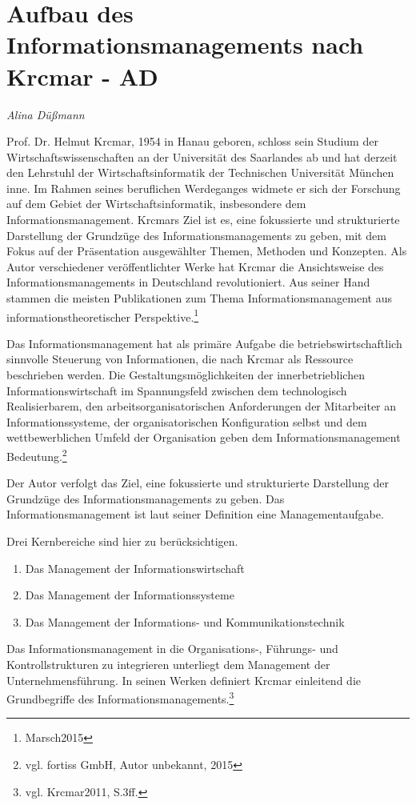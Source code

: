 \section{Aufbau des Informationsmanagements nach Krcmar - AD}
\textit{Alina Düßmann}


Prof. Dr. Helmut Krcmar, 1954 in Hanau geboren, schloss sein Studium der Wirtschaftswissenschaften an der Universität des Saarlandes ab und hat derzeit  den Lehrstuhl der Wirtschaftsinformatik der Technischen Universität München inne. Im Rahmen seines beruflichen Werdeganges widmete er sich der Forschung  auf dem Gebiet der Wirtschaftsinformatik, insbesondere dem Informationsmanagement.
Krcmars Ziel ist es, eine fokussierte und strukturierte Darstellung der Grundzüge des Informationsmanagements zu geben, mit dem Fokus auf der Präsentation ausgewählter Themen, Methoden und Konzepten.
Als Autor verschiedener veröffentlichter Werke hat Krcmar die Ansichtsweise des Informationsmanagements in Deutschland revolutioniert. Aus seiner Hand stammen die meisten Publikationen zum Thema Informationsmanagement aus informationstheoretischer Perspektive.\footnote{Marsch2015}

Das Informationsmanagement hat als primäre Aufgabe die betriebswirtschaftlich sinnvolle Steuerung von Informationen, die nach Krcmar als Ressource beschrieben werden.
Die Gestaltungsmöglichkeiten der innerbetrieblichen Informationswirtschaft im Spannungsfeld zwischen dem technologisch Realisierbarem, den arbeitsorganisatorischen Anforderungen der Mitarbeiter an Informationssysteme, der organisatorischen Konfiguration selbst und dem wettbewerblichen Umfeld der Organisation geben dem Informationsmanagement Bedeutung.\footnote{vgl. fortiss GmbH, Autor unbekannt, 2015}

Der Autor verfolgt das Ziel, eine fokussierte und strukturierte Darstellung der Grundzüge des Informationsmanagements zu geben.
Das Informationsmanagement ist laut seiner Definition eine Managementaufgabe.

Drei Kernbereiche sind hier zu berücksichtigen.
\begin{enumerate}
	\item Das Management der Informationswirtschaft
	\item Das Management der Informationssysteme
	\item Das Management der Informations- und Kommunikationstechnik
\end{enumerate}

Das Informationsmanagement in die Organisations-, Führungs- und Kontrollstrukturen zu integrieren unterliegt dem Management der Unternehmensführung.
In seinen Werken definiert Krcmar einleitend die Grundbegriffe des Informationsmanagements.\footnote{vgl. Krcmar2011, S.3ff.}



